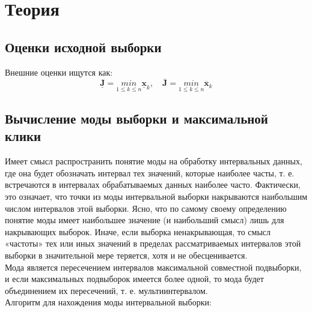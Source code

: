 \documentclass[./main.tex]{subfiles}
\begin{document}
\section{Теория}

\subsection{Оценки исходной выборки} 

Внешние оценки ищутся как: \\

\begin{equation}
	\underline{\bm{J}} = \underset{1 \leq k \leq n }{min} \underline{\bm{x}}_{k}, \quad \overline{\bm{J}} = \underset{1 \leq k \leq n }{min} \overline{\bm{x}}_{k}
\end{equation}


\subsection{Вычисление моды выборки и максимальной клики}

Имеет смысл распространить понятие моды на обработку интервальных данных, где она будет обозначать интервал тех значений, которые наиболее часты, т. е. встречаются в интервалах обрабатываемых данных наиболее часто. Фактически, это означает, что точки из моды интервальной выборки накрываются наибольшим числом интервалов этой выборки. Ясно, что по самому своему определению понятие моды имеет наибольшее значение (и наибольший смысл) лишь для накрывающих выборок. Иначе, если выборка ненакрывающая, то смысл «частоты» тех или иных значений в пределах рассматриваемых интервалов этой выборки в значительной мере теряется, хотя и не обесценивается. \\
Мода является пересечением интервалов максимальной совместной подвыборки, и если максимальных подвыборок имеется более одной, то мода будет объединением их пересечений, т. е. мультиинтервалом.\\

Алгоритм для нахождения моды интервальной выборки: \\
\end{document}
